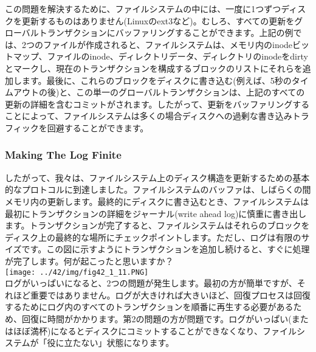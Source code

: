 この問題を解決するために、ファイルシステムの中には、一度に1つずつディスクを更新するものはありません(Linuxのext3など)。むしろ、すべての更新をグローバルトランザクションにバッファリングすることができます。上記の例では、2つのファイルが作成されると、ファイルシステムは、メモリ内のinodeビットマップ、ファイルのinode、ディレクトリデータ、ディレクトリのinodeをdirtyとマークし、現在のトランザクションを構成するブロックのリストにそれらを追加します。最後に、これらのブロックをディスクに書き込む(例えば、5秒のタイムアウトの後)と、この単一のグローバルトランザクションは、上記のすべての更新の詳細を含むコミットがされます。したがって、更新をバッファリングすることによって、ファイルシステムは多くの場合ディスクへの過剰な書き込みトラフィックを回避することができます。

\hypertarget{making-the-log-finite}{%
\subsubsection*{Making The Log Finite}\label{making-the-log-finite}}

したがって、我々は、ファイルシステム上のディスク構造を更新するための基本的なプロトコルに到達しました。ファイルシステムのバッファは、しばらくの間メモリ内の更新します。最終的にディスクに書き込むとき、ファイルシステムは最初にトランザクションの詳細をジャーナル(write
ahead
log)に慎重に書き出します。トランザクションが完了すると、ファイルシステムはそれらのブロックをディスク上の最終的な場所にチェックポイントします。ただし、ログは有限のサイズです。この図に示すようにトランザクションを追加し続けると、すぐに処理が完了します。何が起こったと思いますか？\\
\texttt{[image: ../42/img/fig42\_1\_11.PNG]}\\
ログがいっぱいになると、2つの問題が発生します。最初の方が簡単ですが、それほど重要ではありません。ログが大きければ大きいほど、回復プロセスは回復するためにログ内のすべてのトランザクションを順番に再生する必要があるため、回復に時間がかかります。第2の問題の方が問題です。ログがいっぱい(またはほぼ満杯)になるとディスクにコミットすることができなくなり、ファイルシステムが「役に立たない」状態になります。

